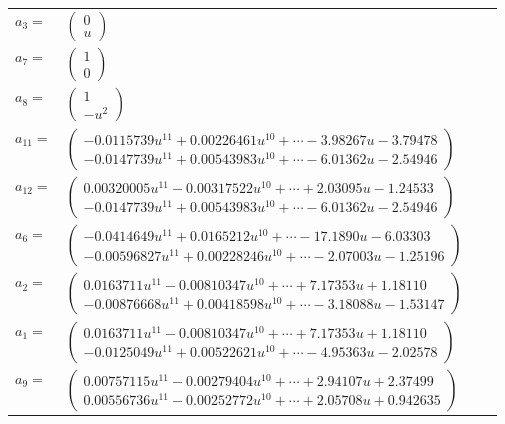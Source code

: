\documentclass[1p]{elsarticle_modified}
\theoremstyle{definition}
\begin{document}
\begin{tabular}{m{7pt} m{180pt} m{7pt} m{180pt} }
\flushright $a_{3}=$&$\begin{pmatrix}0\\u\end{pmatrix}$ \\
\flushright $a_{7}=$&$\begin{pmatrix}1\\0\end{pmatrix}$ \\
\flushright $a_{8}=$&$\begin{pmatrix}1\\- u^2\end{pmatrix}$ \\
\flushright $a_{11}=$&$\begin{pmatrix}-0.0115739 u^{11}+0.00226461 u^{10}+\cdots-3.98267 u-3.79478\\-0.0147739 u^{11}+0.00543983 u^{10}+\cdots-6.01362 u-2.54946\end{pmatrix}$ \\
\flushright $a_{12}=$&$\begin{pmatrix}0.00320005 u^{11}-0.00317522 u^{10}+\cdots+2.03095 u-1.24533\\-0.0147739 u^{11}+0.00543983 u^{10}+\cdots-6.01362 u-2.54946\end{pmatrix}$ \\
\flushright $a_{6}=$&$\begin{pmatrix}-0.0414649 u^{11}+0.0165212 u^{10}+\cdots-17.1890 u-6.03303\\-0.00596827 u^{11}+0.00228246 u^{10}+\cdots-2.07003 u-1.25196\end{pmatrix}$ \\
\flushright $a_{2}=$&$\begin{pmatrix}0.0163711 u^{11}-0.00810347 u^{10}+\cdots+7.17353 u+1.18110\\-0.00876668 u^{11}+0.00418598 u^{10}+\cdots-3.18088 u-1.53147\end{pmatrix}$ \\
\flushright $a_{1}=$&$\begin{pmatrix}0.0163711 u^{11}-0.00810347 u^{10}+\cdots+7.17353 u+1.18110\\-0.0125049 u^{11}+0.00522621 u^{10}+\cdots-4.95363 u-2.02578\end{pmatrix}$ \\
\flushright $a_{9}=$&$\begin{pmatrix}0.00757115 u^{11}-0.00279404 u^{10}+\cdots+2.94107 u+2.37499\\0.00556736 u^{11}-0.00252772 u^{10}+\cdots+2.05708 u+0.942635\end{pmatrix}$ \\

\end{tabular}
\end{document}
